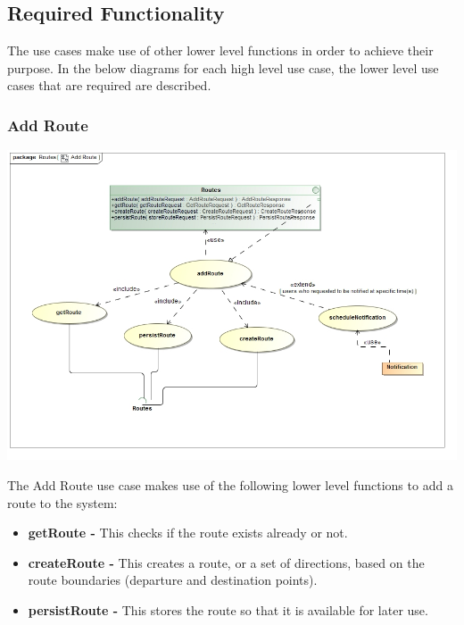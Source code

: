 \documentclass[a4paper,12pt]{article}
\begin{document}
\subsection{Required Functionality}
The use cases make use of other lower level functions in order to achieve their purpose. In the below diagrams for each high level use case, the lower level use cases that are required are described.
\subsubsection{Add Route}
\includegraphics[width=\textwidth]{images/Add_Route.jpg}

The Add Route use case makes use of the following lower level functions to add a route to the system:
\begin{itemize}
\item \textbf{getRoute -} This checks if the route exists already or not.
\item \textbf{createRoute -} This creates a route, or a set of directions, based on the route boundaries (departure and destination points).
\item \textbf{persistRoute -} This stores the route so that it is available for later use.
\end{itemize}
\end{document}
